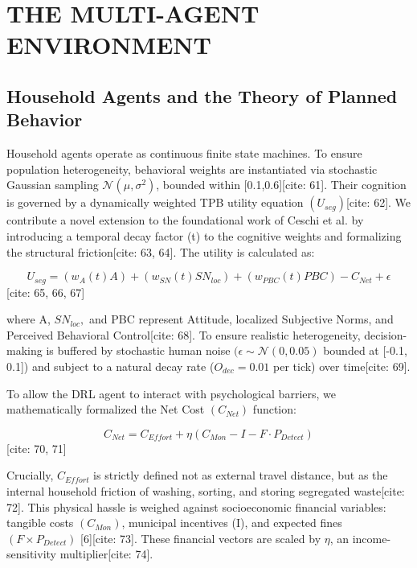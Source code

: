 \documentclass[conference]{IEEEtran}
\begin{document}
\section{THE MULTI-AGENT ENVIRONMENT}

\subsection{Household Agents and the Theory of Planned Behavior}
Household agents operate as continuous finite state machines. To ensure population heterogeneity, behavioral weights are instantiated via stochastic Gaussian sampling $\mathcal{N}(\mu,\sigma^{2})$, bounded within [0.1,0.6][cite: 61]. Their cognition is governed by a dynamically weighted TPB utility equation $(U_{seg})$[cite: 62]. We contribute a novel extension to the foundational work of Ceschi et al. by introducing a temporal decay factor (t) to the cognitive weights and formalizing the structural friction[cite: 63, 64]. The utility is calculated as:

\begin{equation}
U_{seg}=(w_{A}(t)A)+(w_{SN}(t)SN_{loc})+(w_{PBC}(t)PBC)-C_{Net}+\epsilon \label{eq:1}
\end{equation}
[cite: 65, 66, 67]

where A, $SN_{loc},$ and PBC represent Attitude, localized Subjective Norms, and Perceived Behavioral Control[cite: 68]. To ensure realistic heterogeneity, decision-making is buffered by stochastic human noise $(\epsilon\sim\mathcal{N}(0,0.05)$ bounded at [-0.1, 0.1]) and subject to a natural decay rate ($O_{dec}=0.01$ per tick) over time[cite: 69].

To allow the DRL agent to interact with psychological barriers, we mathematically formalized the Net Cost $(C_{Net})$ function:

\begin{equation}
C_{Net}=C_{Effort}+\eta(C_{Mon}-I-F\cdot P_{Detect}) \label{eq:2}
\end{equation}
[cite: 70, 71]

Crucially, $C_{Effort}$ is strictly defined not as external travel distance, but as the internal household friction of washing, sorting, and storing segregated waste[cite: 72]. This physical hassle is weighed against socioeconomic financial variables: tangible costs $(C_{Mon})$, municipal incentives (I), and expected fines $(F\times P_{Detect})$ [6][cite: 73]. These financial vectors are scaled by $\eta$, an income-sensitivity multiplier[cite: 74].
\end{document}
